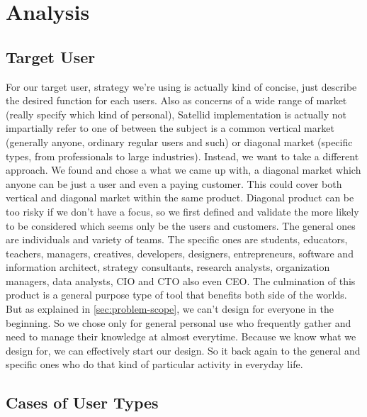 \section{Analysis}
\label{sec:analysis}

\subsection{Target User}

For our target user, strategy we're using is actually kind of concise, just  describe the desired function for each users.
Also as concerns of a wide range of market (really specify which kind of personal), Satellid implementation is actually not impartially refer to one of between the subject is a common vertical market (generally anyone, ordinary regular users and such) or diagonal market (specific types, from professionals to large industries).
Instead, we want to take a different approach.
We found and chose a what we came up with, a diagonal market which anyone can be just a user and even a paying customer.
This could cover both vertical and diagonal market within the same product.
Diagonal product can be too risky if we don't have a focus, so we first defined and validate the more likely to be considered which seems only be the users and customers.
The general ones are individuals and variety of teams.
The specific ones are students, educators, teachers, managers, creatives, developers, designers, entrepreneurs, software and information architect, strategy consultants, research analysts, organization managers, data analysts, \ac{CIO} and \ac{CTO} also even \ac{CEO}.
The culmination of this product is a general purpose type of tool that benefits both side of the worlds.
But as explained in \autoref{sec:problem-scope}, we can't design for everyone in the beginning.
So we chose only for general personal use who frequently gather and need to manage their knowledge at almost everytime.
Because we know what we design for, we can effectively start our design.
So it back again to the general and specific ones who do that kind of particular activity in everyday life.

\subsection{Cases of User Types}

